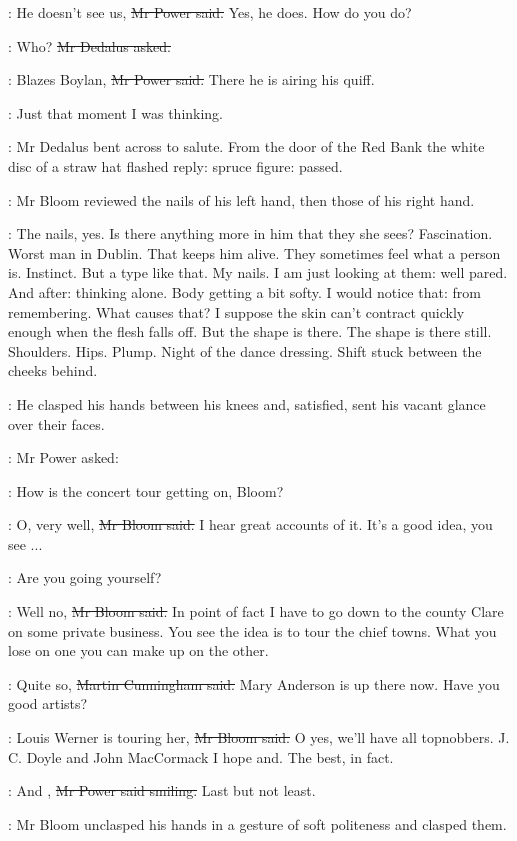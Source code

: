 \power:
He doesn't see us,
\sout{Mr Power said.}
Yes, he does.
How do you do?

\simon:
Who?
\sout{Mr Dedalus asked.}

\power:
Blazes Boylan,
\sout{Mr Power said.}
There he is airing his quiff.

\BloomInt:
Just that moment I was thinking.

:
Mr Dedalus bent across to salute.
From the door of the Red Bank the white disc of a straw hat flashed reply:
spruce figure:
passed.

:
Mr Bloom reviewed the nails of his left hand,
then those of his right hand.

\BloomInt:
The nails, yes.
Is there anything more in him that they she sees?
Fascination.
Worst man in Dublin.
That keeps him alive.
They sometimes feel what a person is.
Instinct.
But a type like that.
My nails.
I am just looking at them:
well pared.
And after:
thinking alone.
Body getting a bit softy.
I would notice that:
from remembering.
What causes that?
I suppose the skin can't contract quickly enough when the flesh falls off.
But the shape is there.
The shape is there still.
Shoulders.
Hips.
Plump.
Night of the dance dressing.
Shift stuck between the cheeks behind.

:
He clasped his hands between his knees
and, satisfied,
sent his vacant glance
over their faces.

:
Mr Power asked:

\power:
How is the concert tour getting on, Bloom?

\Bloom:
O, very well,
\sout{Mr Bloom said.}
I hear great accounts of it.
It's a good idea, you see ...

\power:
Are you going yourself?

\Bloom:
Well no,
\sout{Mr Bloom said.}
In point of fact
I have to go down to the county Clare on some private business.
You see the idea is to tour the chief towns.
What you lose on one
you can make up on the other.

\cunningham:
Quite so,
\sout{Martin Cunningham said.}
Mary Anderson is up there now.
Have you
good artists?

\Bloom:
Louis Werner is touring her,
\sout{Mr Bloom said.}
O yes, we'll have all topnobbers.
J. C. Doyle and John MacCormack I hope and.
The best, in fact.

\power:
And ,
\sout{Mr Power said smiling.}
Last but not least.

:
Mr Bloom unclasped his hands in a gesture of soft politeness and clasped them.

